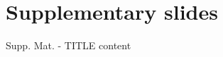 

\appendix

\section*{Supplementary slides}

\begin{frame}{Supp. Mat. - TITLE}
	content
\end{frame}
